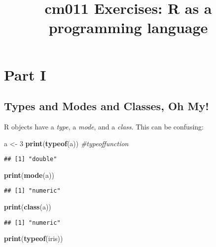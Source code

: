 \documentclass[]{article}
\title{cm011 Exercises: R as a programming language}
\author{}
\date{}
\newenvironment{Shaded}{\begin{snugshade}}{\end{snugshade}}
\newcommand{\KeywordTok}[1]{\textcolor[rgb]{0.13,0.29,0.53}{\textbf{#1}}}
\newcommand{\DecValTok}[1]{\textcolor[rgb]{0.00,0.00,0.81}{#1}}
\newcommand{\StringTok}[1]{\textcolor[rgb]{0.31,0.60,0.02}{#1}}
\newcommand{\CommentTok}[1]{\textcolor[rgb]{0.56,0.35,0.01}{\textit{#1}}}
\newcommand{\NormalTok}[1]{#1}
\begin{document}
\maketitle

\section{Part I}\label{part-i}

\subsection{Types and Modes and Classes, Oh
My!}\label{types-and-modes-and-classes-oh-my}

R objects have a \emph{type}, a \emph{mode}, and a \emph{class}. This
can be confusing:

\begin{Shaded}
\begin{Highlighting}[]
\NormalTok{a <-}\StringTok{ }\DecValTok{3}
\KeywordTok{print}\NormalTok{(}\KeywordTok{typeof}\NormalTok{(a)) }\CommentTok{#typeoffunction}
\end{Highlighting}
\end{Shaded}

\begin{verbatim}
## [1] "double"
\end{verbatim}

\begin{Shaded}
\begin{Highlighting}[]
\KeywordTok{print}\NormalTok{(}\KeywordTok{mode}\NormalTok{(a))}
\end{Highlighting}
\end{Shaded}

\begin{verbatim}
## [1] "numeric"
\end{verbatim}

\begin{Shaded}
\begin{Highlighting}[]
\KeywordTok{print}\NormalTok{(}\KeywordTok{class}\NormalTok{(a))}
\end{Highlighting}
\end{Shaded}

\begin{verbatim}
## [1] "numeric"
\end{verbatim}

\begin{Shaded}
\begin{Highlighting}[]
\KeywordTok{print}\NormalTok{(}\KeywordTok{typeof}\NormalTok{(iris))}
\end{Highlighting}
\end{Shaded}
\end{document}
